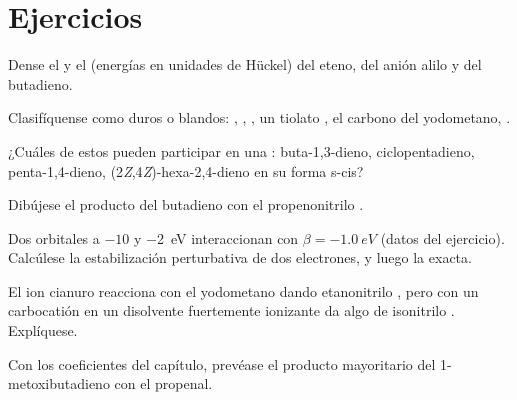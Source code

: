 \section{Ejercicios}

\begin{exercise}[$\star$]\label{exo:b2:frontier-orbitals:1}
Dense el  y el  (energías en unidades de Hückel) del eteno, del anión alilo
y del butadieno.
\end{exercise}

\begin{exercise}[$\star$]\label{exo:b2:frontier-orbitals:2}
Clasifíquense como duros o blandos: , , , un tiolato , el carbono del
yodometano, .
\end{exercise}

\begin{exercise}[$\star$]\label{exo:b2:frontier-orbitals:3}
¿Cuáles de estos  pueden participar en una : buta-1,3-dieno,
ciclopentadieno, penta-1,4-dieno, (2\textit{Z},4\textit{Z})-hexa-2,4-dieno en su forma
s-cis?
\end{exercise}

\begin{exercise}[$\star$]\label{exo:b2:frontier-orbitals:4}
Dibújese el producto del butadieno con el propenonitrilo .
\end{exercise}

\begin{exercise}[$\star\star$]\label{exo:b2:frontier-orbitals:5}
Dos orbitales a $-10$ y \qty{-2}{eV} interaccionan con $\beta = \qty{-1.0}{eV}$ (datos del ejercicio).
Calcúlese la estabilización perturbativa de dos electrones, y luego la exacta.
\end{exercise}

\begin{exercise}[$\star\star$]\label{exo:b2:frontier-orbitals:6}
El ion cianuro reacciona con el yodometano dando etanonitrilo , pero con un
carbocatión en un disolvente fuertemente ionizante da algo de isonitrilo . Explíquese.
\end{exercise}

\begin{exercise}[$\star\star$]\label{exo:b2:frontier-orbitals:7}
Con los coeficientes del capítulo, prevéase el producto mayoritario del 1-metoxibutadieno
con el propenal.
\end{exercise}


